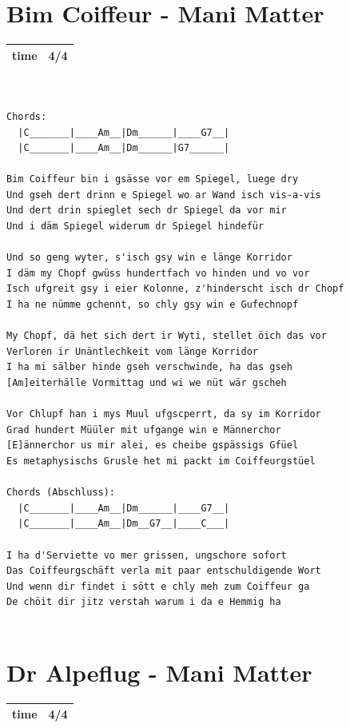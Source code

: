 \documentclass[
]{book}
\let\stdsection\section
\renewcommand\section{\clearpage\stdsection}
\begin{document}
\hypertarget{bim-coiffeur---mani-matter}{%
\section{Bim Coiffeur - Mani Matter}\label{bim-coiffeur---mani-matter}}

\begin{longtable}[]{@{}ll@{}}
\toprule
\endhead
time & 4/4\tabularnewline
\bottomrule
\end{longtable}

\begin{verbatim}


Chords:
  |C_______|____Am__|Dm______|____G7__|
  |C_______|____Am__|Dm______|G7______|

Bim Coiffeur bin i gsässe vor em Spiegel, luege dry
Und gseh dert drinn e Spiegel wo ar Wand isch vis-a-vis
Und dert drin spieglet sech dr Spiegel da vor mir
Und i däm Spiegel widerum dr Spiegel hindefür

Und so geng wyter, s'isch gsy win e länge Korridor
I däm my Chopf gwüss hundertfach vo hinden und vo vor
Isch ufgreit gsy i eier Kolonne, z'hinderscht isch dr Chopf
I ha ne nümme gchennt, so chly gsy win e Gufechnopf

My Chopf, dä het sich dert ir Wyti, stellet öich das vor
Verloren ir Unäntlechkeit vom länge Korridor
I ha mi sälber hinde gseh verschwinde, ha das gseh
[Am]eiterhälle Vormittag und wi we nüt wär gscheh

Vor Chlupf han i mys Muul ufgscperrt, da sy im Korridor
Grad hundert Müüler mit ufgange win e Männerchor
[E]ännerchor us mir alei, es cheibe gspässigs Gfüel
Es metaphysischs Grusle het mi packt im Coiffeurgstüel

Chords (Abschluss):
  |C_______|____Am__|Dm______|____G7__|
  |C_______|____Am__|Dm__G7__|____C___| 

I ha d'Serviette vo mer grissen, ungschore sofort
Das Coiffeurgschäft verla mit paar entschuldigende Wort
Und wenn dir findet i sött e chly meh zum Coiffeur ga
De chöit dir jitz verstah warum i da e Hemmig ha


\end{verbatim}

\hypertarget{dr-alpeflug---mani-matter}{%
\section{Dr Alpeflug - Mani Matter}\label{dr-alpeflug---mani-matter}}

\begin{longtable}[]{@{}ll@{}}
\toprule
\endhead
time & 4/4\tabularnewline
\bottomrule
\end{longtable}
\end{document}
